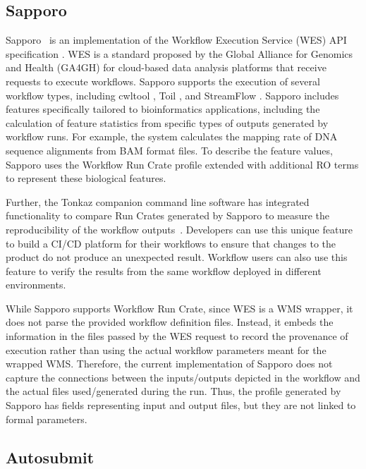 \documentclass[10pt,letterpaper]{article}
\begin{document}
\subsection{Sapporo}\label{sapporo}

Sapporo~\cite{Suetake 2022a} is an implementation of the Workflow Execution Service (WES) API specification \cite{Magee 2018}.
WES is a standard proposed by the Global Alliance for Genomics and Health (GA4GH) for cloud-based data analysis platforms that receive requests to execute workflows.
Sapporo supports the execution of several workflow types, including cwltool \cite{Amstutz 2023}, Toil \cite{Vivian 2017}, and StreamFlow \cite{Colonnelli 2020}.
Sapporo includes features specifically tailored to bioinformatics applications, including the calculation of feature statistics from specific types of outputs generated by workflow runs.
For example, the system calculates the mapping rate of DNA sequence alignments from BAM format files.
To describe the feature values, Sapporo uses the Workflow Run Crate profile extended with additional RO terms to represent these biological features.

Further, the Tonkaz companion command line software has integrated functionality to compare Run Crates generated by Sapporo to measure the reproducibility of the workflow outputs~\cite{Suetake 2022b}.
Developers can use this unique feature to build a CI/CD platform for their workflows to ensure that changes to the product do not produce an unexpected result.
Workflow users can also use this feature to verify the results from the same workflow deployed in different environments.

While Sapporo supports Workflow Run Crate, since WES is a WMS wrapper, it does not parse the provided workflow definition files. 
Instead, it embeds the information in the files passed by the WES request to record the provenance of execution rather than using the actual workflow parameters meant for the wrapped WMS.
Therefore, the current implementation of Sapporo does not capture the connections between the inputs/outputs depicted in the workflow and the actual files used/generated during the run.
Thus, the profile generated by Sapporo has fields representing input and output files, but they are not linked to formal parameters.

\subsection{Autosubmit}\label{autosubmit}
\end{document}
